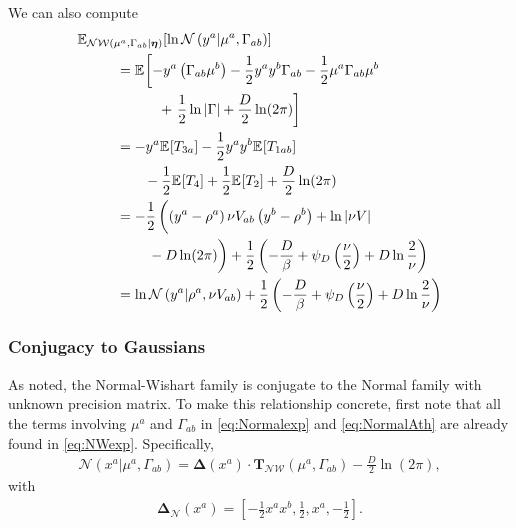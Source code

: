 \documentclass[aps,showpacs,twocolumn,prd,superscriptaddress,nofootinbib]{revtex4}
\newcommand{\nn}{\nonumber}
\newcommand{\E}[1]{{\mathbb E}_{#1}\!}
\begin{document}
We can also compute
\begin{align}
  \E{\mathcal {NW}\left(\mu^a,\Gamma_{ab}|\bm\eta\right)}\left[\ln\mathcal{N}\left(y^a|\mu^a,\Gamma_{ab}\right)\right]\mkern-200mu &\mkern200mu\nn\\
  &=\E{}\left[-y^a\left(\Gamma_{ab}\mu^b\right) -\frac12 y^ay^b \Gamma_{ab} -\frac12 \mu^a\Gamma_{ab}\mu^b\right.\nn\\
    &\qquad\quad+\left.\frac12\ln\left|\Gamma\right|+\frac D2\ln(2\pi)  \right]\nn\\
  &=-y^a\E{}\left[T_{3a}\right] -\frac12 y^ay^b\E{}\left[T_{1ab}\right]\nn\\
  &\qquad-\frac12 \E{}\left[T_4\right]+\frac12\E{}\left[T_2\right]+\frac D2\ln(2\pi)\nn\\
  &=-\frac12\left(\left(y^a-\rho^a\right)\nu V_{ab}\left(y^b-\rho^b\right)+ \ln\left|\nu V\right|\vphantom{\frac12}\right.\nn\\
  &\qquad\left.\vphantom{\frac12}-D\ln(2\pi)\right)+\frac12\left(-\frac D\beta+\psi_D\left(\frac\nu2\right)+D\ln\frac2\nu \right)\nn\\
  &=\ln\mathcal{N}\left(y^a|\rho^a,\nu V_{ab}\right)+\frac12\left(-\frac D\beta+\psi_D\left(\frac\nu2\right)+D\ln\frac2\nu \right)\label{eq:ENWoflogN}
\end{align}

\subsubsection{Conjugacy to Gaussians}
As noted, the Normal-Wishart family is conjugate to the Normal family with unknown precision matrix.  To make this relationship concrete, first note that all the terms involving $\mu^a$ and $\Gamma_{ab}$ in \eqref{eq:Normalexp} and \eqref{eq:NormalAth} are already found in \eqref{eq:NWexp}.  Specifically,
\begin{align*}
  \mathcal{N}(x^a|\mu^a,\Gamma_{ab})=\bm\Delta(x^a)\cdot\bm T_{\mathcal{NW}}(\mu^a,\Gamma_{ab})-\frac D2\ln(2\pi),
\end{align*}
with
\begin{align}
  \bm\Delta_{\mathcal{N}}(x^a)=\left[-\frac12x^ax^b,\frac12,x^a,-\frac12\right].\label{eq:NormalDelta}
\end{align}
\end{document}
